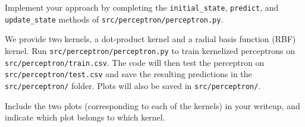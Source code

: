 \item {} Implement your approach by completing the
\texttt{initial\_state}, \texttt{predict}, and \texttt{update\_state} methods
of \texttt{src/perceptron/perceptron.py}.


We provide two kernels, a dot-product kernel and a
radial basis function (RBF) kernel. Run \texttt{src/perceptron/perceptron.py} to train
kernelized perceptrons on \texttt{src/perceptron/train.csv}. The code will then test
the perceptron on \texttt{src/perceptron/test.csv} and save the resulting
predictions in the \texttt{src/perceptron/} folder. Plots will also be saved in
\texttt{src/perceptron/}.


Include the two plots (corresponding to each of the kernels) in your writeup,
and indicate which plot belongs to which kernel.
